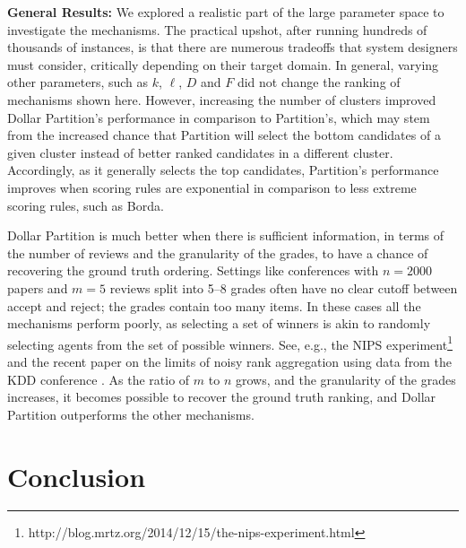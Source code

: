 \documentclass[letterpaper]{article}
\begin{document}
\smallskip  \noindent
\textbf{General Results:} We explored a realistic part of the large parameter space to investigate the mechanisms. The practical upshot, after running hundreds of thousands of instances, is that there are numerous tradeoffs that system designers must consider, critically depending on their target domain. In general, varying other parameters, such as $k$, $\ell$, $D$ and $F$ did not change the ranking of mechanisms shown here. However, increasing the number of clusters improved Dollar Partition's performance in comparison to Partition's, which may stem from the increased chance that Partition will select the bottom candidates of a given cluster instead of better ranked candidates in a different cluster. Accordingly, as it generally selects the top candidates, Partition's performance improves when scoring rules are exponential in comparison to less extreme scoring rules, such as Borda.

Dollar Partition is much better when there is sufficient information, in terms of the number of reviews and the granularity of the grades, to have a chance of recovering the ground truth ordering. Settings like conferences with $n=2000$ papers and $m=5$ reviews split into 5--8 grades often have no clear cutoff between accept and reject; the grades contain too many items. In these cases all the mechanisms perform poorly, as selecting a set of winners is akin to randomly selecting agents from the set of possible winners. See, e.g., the NIPS experiment\footnote{http://blog.mrtz.org/2014/12/15/the-nips-experiment.html} and the recent paper on the limits of noisy rank aggregation using data from the KDD conference \cite{JoRa15a}. As the ratio of $m$ to $n$ grows, and the granularity of the grades increases, it becomes possible to recover the ground truth ranking, and Dollar Partition outperforms the other mechanisms.







\section{Conclusion}
\end{document}
